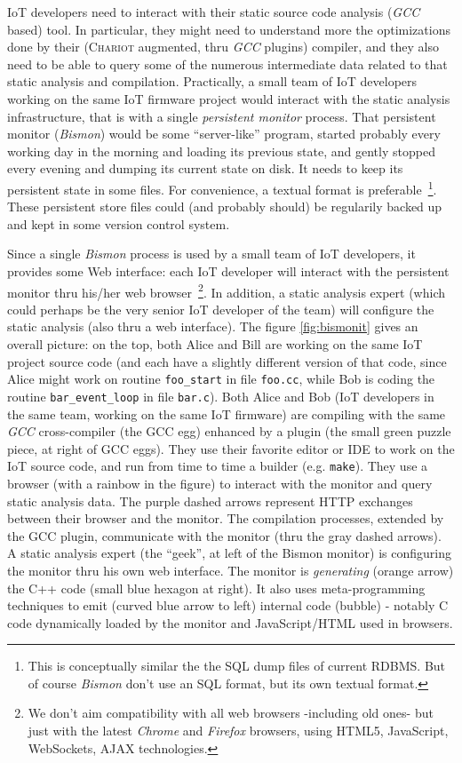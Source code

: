 IoT developers need to interact with their static source code analysis
(\emph{GCC} based) tool. In particular, they might need to understand
more the optimizations done by their (\textsc{Chariot} augmented, thru
\emph{GCC} plugins) compiler, and they also need to be able to query
some of the numerous intermediate data related to that static analysis
and compilation. Practically, a small team of IoT developers working
on the same IoT firmware project would interact with the static
analysis infrastructure, that is with a single \emph{persistent
  monitor} process. That persistent monitor (\emph{Bismon}) would be
some ``server-like'' program, started probably every working day in
the morning and loading its previous state, and gently stopped every
evening and dumping its current state on disk. It needs to keep its
persistent state in some files. For convenience, a textual format is
preferable~\footnote{This is conceptually similar the the SQL dump
  files of current RDBMS. But of course \emph{Bismon} don't use an SQL
  format, but its own textual format.}. These persistent store files
could (and probably should) be regularily backed up and kept in some
version control system.

Since a single \emph{Bismon} process is used by a small team of IoT
developers, it provides some Web interface: each IoT developer will
interact with the persistent monitor thru his/her web
browser~\footnote{We don't aim compatibility with all web browsers
  -including old ones- but just with the latest \emph{Chrome} and
  \emph{Firefox} browsers, using HTML5, JavaScript, WebSockets, AJAX
  technologies.}. In addition, a static analysis expert (which could
perhaps be the very senior IoT developer of the team) will configure
the static analysis (also thru a web interface). The figure
\ref{fig:bismonit} gives an overall picture: on the top, both Alice
and Bill are working on the same IoT project source code (and each
have a slightly different version of that code, since Alice might work
on routine \texttt{foo\_start} in file \texttt{foo.cc}, while Bob is
coding the routine \texttt{bar\_event\_loop} in file
\texttt{bar.c}). Both Alice and Bob (IoT developers in the same team,
working on the same IoT firmware) are compiling with the same
\emph{GCC} cross-compiler (the GCC egg) enhanced by a plugin (the
small green puzzle piece, at right of GCC eggs). They use their
favorite editor or IDE to work on the IoT source code, and run from
time to time a builder (e.g. \texttt{make}). They use a browser (with
a rainbow in the figure) to interact with the monitor and query static
analysis data. The purple dashed arrows represent HTTP exchanges
between their browser and the monitor. The compilation processes,
extended by the GCC plugin, communicate with the monitor (thru the
gray dashed arrows). A static analysis expert (the ``geek'', at left
of the Bismon monitor) is configuring the monitor thru his own web
interface. The monitor is \emph{generating} (orange arrow) the C++
code (small blue hexagon at right). It also uses meta-programming
techniques to emit (curved blue arrow to left) internal code (bubble)
- notably C code dynamically loaded by the monitor and JavaScript/HTML
used in browsers.

